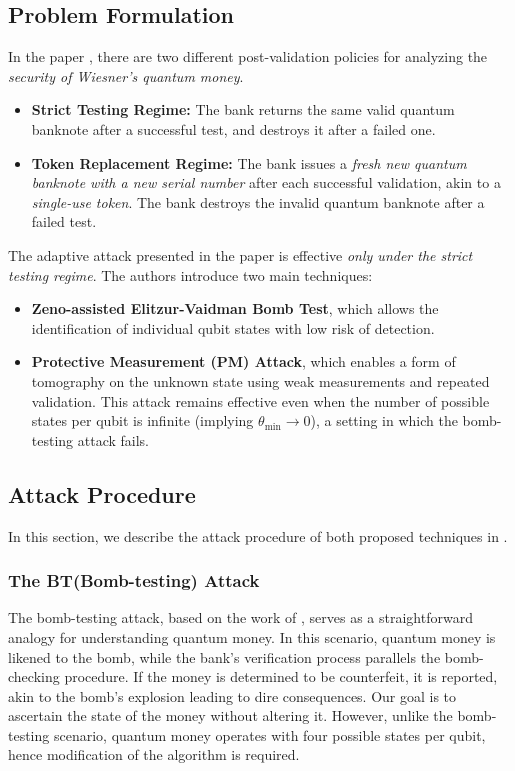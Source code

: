 \documentclass{article} %
\begin{document}
\subsection{Problem Formulation}

In the paper \citep{Nagaj2016Adaptive}, there are two different post-validation policies for analyzing the \emph{security of Wiesner’s quantum money}.
\begin{itemize}
    \item \textbf{Strict Testing Regime:} The bank returns the same valid quantum banknote after a successful test, and destroys it after a failed one.
    \item \textbf{Token Replacement Regime:} The bank issues a \emph{fresh new quantum banknote with a new serial number} after each successful validation, akin to a \emph{single-use token}. The bank destroys the invalid quantum banknote after a failed test.
\end{itemize}

The adaptive attack presented in the paper \citep{Nagaj2016Adaptive} is effective \emph{only under the strict testing regime}. The authors introduce two main techniques:
\begin{itemize}
    \item \textbf{Zeno-assisted Elitzur-Vaidman Bomb Test}, which allows the identification of individual qubit states with low risk of detection.
    \item \textbf{Protective Measurement (PM) Attack}, which enables a form of tomography on the unknown state using weak measurements and repeated validation. This attack remains effective even when the number of possible states per qubit is infinite (implying $\theta_{\min} \to 0$), a setting in which the bomb-testing attack fails.
\end{itemize}




\newpage

\subsection{Attack Procedure}

In this section, we describe the attack procedure of both proposed techniques in \citep{Nagaj2016Adaptive}.

\subsubsection{The BT(Bomb-testing) Attack}
The bomb-testing attack, based on the work of \citep{zeno}, serves as a straightforward analogy for understanding quantum money. In this scenario, quantum money is likened to the bomb, while the bank's verification process parallels the bomb-checking procedure. If the money is determined to be counterfeit, it is reported, akin to the bomb's explosion leading to dire consequences. Our goal is to ascertain the state of the money without altering it. However, unlike the bomb-testing scenario, quantum money operates with four possible states per qubit, hence modification of the algorithm is required.
\end{document}
